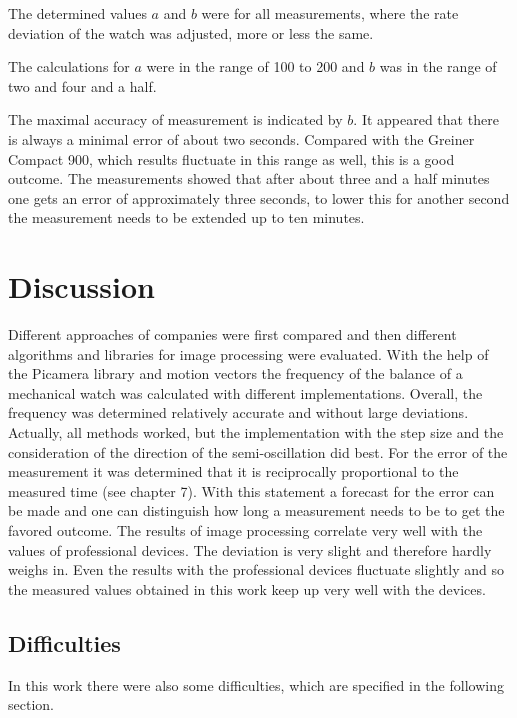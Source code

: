 \documentclass[12pt, a4paper]{report}
\begin{document}
The determined values $a$ and $b$ were for all measurements, where the rate deviation of the watch was adjusted, more or less the same.

The calculations for $a$ were in the range of 100 to 200 and $b$ was in the range of two and four and a half. 


The maximal accuracy of measurement is indicated by $b$. It appeared that there is always a minimal error of about two seconds. Compared with the Greiner Compact 900, which results fluctuate in this range as well, this is a good outcome. 
The measurements showed that after about three and a half minutes one gets an error of approximately three seconds, to lower this for another second the measurement needs to be extended up to ten minutes.     
    
    \chapter{Discussion}
    Different approaches of companies were first compared and then different algorithms and libraries for image processing were evaluated. 
    \newline
    With the help of the Picamera library and motion vectors the frequency of the balance of a mechanical watch was calculated with different implementations. Overall, the frequency was determined relatively accurate and without large deviations. Actually, all methods worked, but the implementation with the step size and the consideration of the direction of the semi-oscillation did best.
    \newline
    For the error of the measurement it was determined that it is reciprocally proportional to the measured time (see chapter 7). With this statement a forecast for the error can be made and one can distinguish how long a measurement needs to be to get the favored outcome.
    \newline
    The results of image processing correlate very well with the values of professional devices. The deviation is very slight and therefore hardly weighs in. Even the results with the professional devices fluctuate slightly and so the measured values obtained in this work keep up very well with the devices. 

    \section{Difficulties}
In this work there were also some difficulties, which are specified in the following section.
\end{document}
